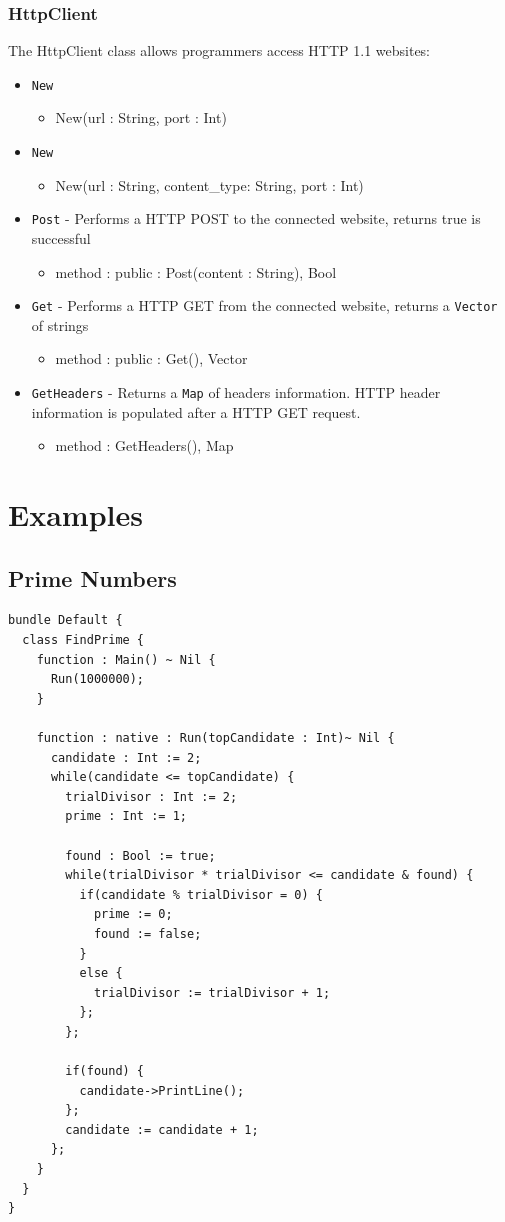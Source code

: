 \documentclass[12pt]{article}
\begin{document}
\subsubsection{HttpClient}
The HttpClient class allows programmers access HTTP 1.1 websites:
\begin{itemize}
    \item \texttt{New}
    	\begin{itemize}
	\item New(url : String, port : Int)
	\end{itemize}
    \item \texttt{New}
    	\begin{itemize}
	\item New(url : String, content\_type: String, port : Int)
	\end{itemize}
    \item \texttt{Post} - Performs a HTTP POST to the connected website, returns true is successful
    	\begin{itemize}
	\item method : public : Post(content : String), Bool
	\end{itemize}
    \item \texttt{Get} - Performs a HTTP GET from the connected website, returns a \texttt{Vector} of strings
    	\begin{itemize}
	\item method : public : Get(), Vector
	\end{itemize}
    \item \texttt{GetHeaders} - Returns a \texttt{Map} of headers information.  HTTP header information is populated after a HTTP GET request.
    	\begin{itemize}
	\item method : GetHeaders(), Map
	\end{itemize}
\end{itemize}

\section{Examples}
\subsection{Prime Numbers}
\begin{verbatim}
bundle Default {
  class FindPrime {
    function : Main() ~ Nil {
      Run(1000000);
    }

    function : native : Run(topCandidate : Int)~ Nil {
      candidate : Int := 2;
      while(candidate <= topCandidate) {
        trialDivisor : Int := 2;
        prime : Int := 1;

        found : Bool := true;
        while(trialDivisor * trialDivisor <= candidate & found) {
          if(candidate % trialDivisor = 0) {
            prime := 0;
            found := false;
          }
          else {
            trialDivisor := trialDivisor + 1;
          };
        };

        if(found) {
          candidate->PrintLine();
        };
        candidate := candidate + 1;
      };
    }
  }
}
\end{verbatim}
\end{document}
